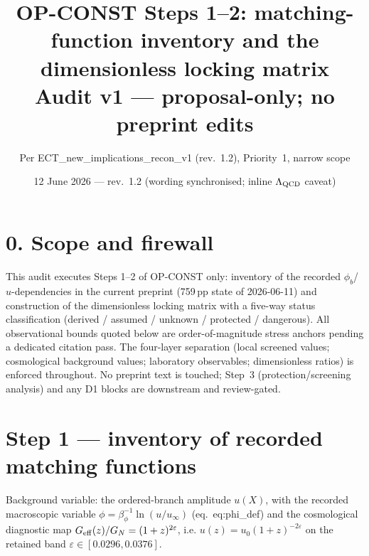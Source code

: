 \documentclass[11pt,a4paper]{article}
\title{\textbf{OP-CONST Steps 1--2: matching-function inventory and the
dimensionless locking matrix}\\\large Audit v1 --- proposal-only; no preprint edits}
\author{Per ECT\_new\_implications\_recon\_v1 (rev.~1.2), Priority~1, narrow scope}
\date{12 June 2026 --- rev.~1.2 (wording synchronised; inline $\Lambda_{\rm QCD}$ caveat)}
\begin{document}
\maketitle

\section*{0. Scope and firewall}
This audit executes Steps 1--2 of OP-CONST only: inventory of the recorded
$\phi_b$/$u$-dependencies in the current preprint (759\,pp state of 2026-06-11) and
construction of the dimensionless locking matrix with a five-way status
classification (derived / assumed / unknown / protected / dangerous). All
observational bounds quoted below are order-of-magnitude stress anchors pending a
dedicated citation pass. The four-layer separation (local screened values;
cosmological background values; laboratory observables; dimensionless ratios) is
enforced throughout. No preprint text is touched; Step~3 (protection/screening
analysis) and any D1 blocks are downstream and review-gated.

\section{Step 1 --- inventory of recorded matching functions}
Background variable: the ordered-branch amplitude $u(X)$, with the recorded
macroscopic variable $\phi=\beta_\phi^{-1}\ln(u/u_\infty)$ (eq.~eq:phi\_def) and the
cosmological diagnostic map $G_{\rm eff}(z)/G_N=(1+z)^{2\varepsilon}$, i.e.
$u(z)=u_0(1+z)^{-2\varepsilon}$ on the retained band
$\varepsilon\in[0.0296,0.0376]$.
\end{document}
